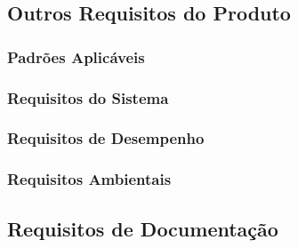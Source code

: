 \subsection{Outros Requisitos do Produto}

\subsubsection{Padrões Aplicáveis}

\subsubsection{Requisitos do Sistema}

\subsubsection{Requisitos de Desempenho}

\subsubsection{Requisitos Ambientais}

\subsection{Requisitos de Documentação}

